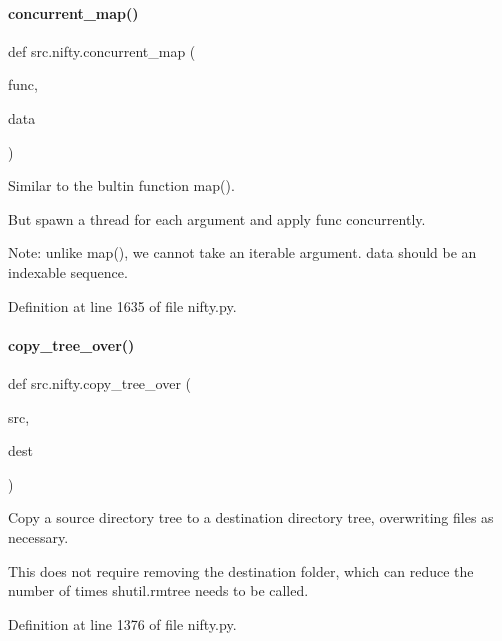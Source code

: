\paragraph{\texorpdfstring{concurrent\+\_\+map()}{concurrent\_map()}}
{\footnotesize\ttfamily def src.\+nifty.\+concurrent\+\_\+map (\begin{DoxyParamCaption}\item[{}]{func,  }\item[{}]{data }\end{DoxyParamCaption})}



Similar to the bultin function map(). 

But spawn a thread for each argument and apply {\ttfamily func} concurrently.

Note\+: unlike map(), we cannot take an iterable argument. {\ttfamily data} should be an indexable sequence. 

Definition at line 1635 of file nifty.\+py.

\mbox{\label{namespacesrc_1_1nifty_ab89b066ca49605c05ffdaa8959512f15}} 
\paragraph{\texorpdfstring{copy\+\_\+tree\+\_\+over()}{copy\_tree\_over()}}
{\footnotesize\ttfamily def src.\+nifty.\+copy\+\_\+tree\+\_\+over (\begin{DoxyParamCaption}\item[{}]{src,  }\item[{}]{dest }\end{DoxyParamCaption})}



Copy a source directory tree to a destination directory tree, overwriting files as necessary. 

This does not require removing the destination folder, which can reduce the number of times shutil.\+rmtree needs to be called. 

Definition at line 1376 of file nifty.\+py.

\mbox{\label{namespacesrc_1_1nifty_a688498187c471801b1e64fd7f4e35424}} 
